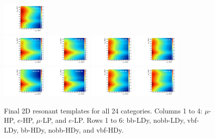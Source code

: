 \begin{figure}[htbp]
  \includegraphics[width=0.2\textwidth]{fig/2Dfit/template_res_e_LP_bb_HDy.pdf}\\
  \includegraphics[width=0.2\textwidth]{fig/2Dfit/template_res_mu_HP_nobb_HDy.pdf}
  \includegraphics[width=0.2\textwidth]{fig/2Dfit/template_res_e_HP_nobb_HDy.pdf}
  \includegraphics[width=0.2\textwidth]{fig/2Dfit/template_res_mu_LP_nobb_HDy.pdf}
  \includegraphics[width=0.2\textwidth]{fig/2Dfit/template_res_e_LP_nobb_HDy.pdf}\\
  \includegraphics[width=0.2\textwidth]{fig/2Dfit/template_res_mu_HP_vbf_HDy.pdf}
  \includegraphics[width=0.2\textwidth]{fig/2Dfit/template_res_e_HP_vbf_HDy.pdf}
  \includegraphics[width=0.2\textwidth]{fig/2Dfit/template_res_mu_LP_vbf_HDy.pdf}
  \includegraphics[width=0.2\textwidth]{fig/2Dfit/template_res_e_LP_vbf_HDy.pdf}\\
  \caption{
    Final 2D resonant templates for all 24 categories.
    Columns 1 to 4: $\mu$-HP, $e$-HP, $\mu$-LP, and $e$-LP.
    Rows 1 to 6: bb-LDy, nobb-LDy, vbf-LDy, bb-HDy, nobb-HDy, and vbf-HDy.
  }
  \label{fig:template_res_Run2}
\end{figure}

